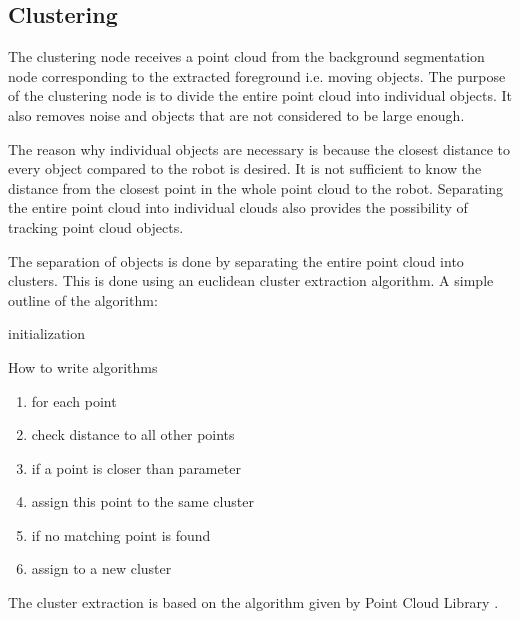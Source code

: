 
\subsection{Clustering}
The clustering node receives a point cloud from the background segmentation node corresponding to the extracted foreground i.e. moving objects. The purpose of the clustering node is to divide the entire point cloud into individual objects. It also removes noise and objects that are not considered to be large enough.  

The reason why individual objects are necessary is because the closest distance to every object compared to the robot is desired. It is not sufficient to know the distance from the closest point in the whole point cloud to the robot. Separating the entire point cloud into individual clouds also provides the possibility of tracking point cloud objects. 

The separation of objects is done by separating the entire point cloud into clusters. This is done using an euclidean cluster extraction algorithm. A simple outline of the algorithm:


\begin{algorithm}[H]
 \SetAlgoLined %
 initialization\;
 \caption{How to write algorithms}
\end{algorithm}

\begin{enumerate}
\item for each point
\item check distance to all other points
\item if a point is closer than parameter
\item assign this point to the same cluster
\item if no matching point is found
\item assign to a new cluster
\end{enumerate} 

 The cluster extraction is based on the algorithm given by Point Cloud Library \cite{CE}.